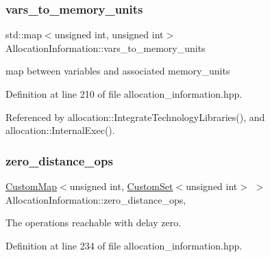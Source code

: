 \subsubsection{\texorpdfstring{vars\+\_\+to\+\_\+memory\+\_\+units}{vars\_to\_memory\_units}}
{\footnotesize\ttfamily std\+::map$<$unsigned int, unsigned int$>$ Allocation\+Information\+::vars\+\_\+to\+\_\+memory\+\_\+units\hspace{0.3cm}{\ttfamily [private]}}



map between variables and associated memory\+\_\+units 



Definition at line 210 of file allocation\+\_\+information.\+hpp.



Referenced by allocation\+::\+Integrate\+Technology\+Libraries(), and allocation\+::\+Internal\+Exec().

\mbox{\label{classAllocationInformation_a84fb709cf7df7a3c902d86c97569009a}} 
\subsubsection{\texorpdfstring{zero\+\_\+distance\+\_\+ops}{zero\_distance\_ops}}
{\footnotesize\ttfamily \hyperlink{custom__map_8hpp_a18ca01763abbe3e5623223bfe5aaac6b}{Custom\+Map}$<$unsigned int, \hyperlink{custom__set_8hpp_a615bc2f42fc38a4bb1790d12c759e86f}{Custom\+Set}$<$unsigned int$>$ $>$ Allocation\+Information\+::zero\+\_\+distance\+\_\+ops\hspace{0.3cm}{\ttfamily [mutable]}, {\ttfamily [private]}}



The operations reachable with delay zero. 



Definition at line 234 of file allocation\+\_\+information.\+hpp.

\mbox{\label{classAllocationInformation_a60156c362a1188cda46215299774b3f7}} 
